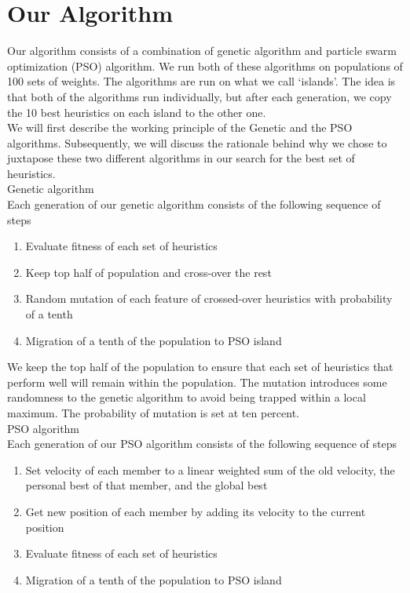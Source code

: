 \documentclass{article}
\begin{document}
    \section{Our Algorithm}

    Our algorithm consists of a combination of genetic algorithm and particle swarm
	optimization (PSO) algorithm. We run both of these algorithms on populations of
	100 sets of weights. The algorithms are run on what we call ‘islands’. The idea
	is that both of the algorithms run individually, but after each generation, we
	copy the 10 best heuristics on each island to the other one.\\
	We will first describe the working principle
	of the Genetic and the PSO algorithms. Subsequently, we will
	discuss the rationale behind why we chose to juxtapose these two different
	algorithms in our search for the best set of heuristics.\\

	Genetic algorithm\\
	Each generation of our genetic algorithm consists of the following sequence of steps
	\begin{enumerate}
		\item Evaluate fitness of each set of heuristics
		\item Keep top half of population and cross-over the rest
		\item Random mutation of each feature of crossed-over heuristics with
		probability of a tenth
		\item Migration of a tenth of the population to PSO island
	\end{enumerate}
	We keep the top half of the population to ensure that each set of heuristics
	that perform well will remain within the population. The mutation introduces
	some randomness to the genetic algorithm to avoid being trapped within a local
	maximum. The probability of mutation is set at ten percent.\\

	PSO algorithm\\
	Each generation of our PSO algorithm consists of the following sequence of steps
	\begin{enumerate}
		\item Set velocity of each member to a linear weighted sum of the old velocity,
		the personal best of that member, and the global best
		\item Get new position of each member by adding its velocity to the current
		position
		\item Evaluate fitness of each set of heuristics
		\item Migration of a tenth of the population to PSO island
	\end{enumerate}
\end{document}
